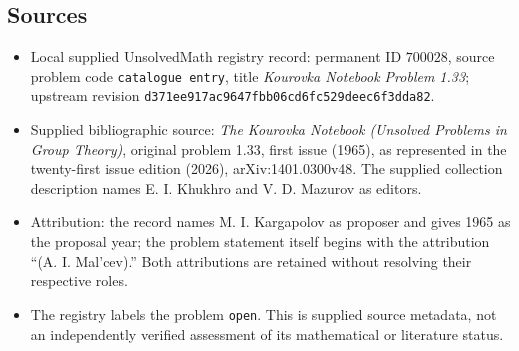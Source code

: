 \documentclass[11pt]{article}
\begin{document}
\subsection{Sources}
\begin{itemize}
\item Local supplied UnsolvedMath registry record: permanent ID \(700028\), source problem code \texttt{catalogue entry}, title \emph{Kourovka Notebook Problem 1.33}; upstream revision \texttt{d371ee917ac9647fbb06cd6fc529deec6f3dda82}.
\item Supplied bibliographic source: \emph{The Kourovka Notebook (Unsolved Problems in Group Theory)}, original problem 1.33, first issue (1965), as represented in the twenty-first issue edition (2026), arXiv:1401.0300v48. The supplied collection description names E. I. Khukhro and V. D. Mazurov as editors.
\item Attribution: the record names M. I. Kargapolov as proposer and gives 1965 as the proposal year; the problem statement itself begins with the attribution ``(A. I. Mal'cev).'' Both attributions are retained without resolving their respective roles.
\item The registry labels the problem \texttt{open}. This is supplied source metadata, not an independently verified assessment of its mathematical or literature status.
\end{itemize}
\end{document}
